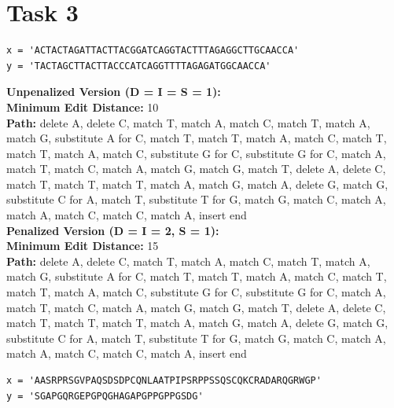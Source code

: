 \documentclass{article}
\begin{document}




\section*{Task 3}

\begin{lstlisting}
x = 'ACTACTAGATTACTTACGGATCAGGTACTTTAGAGGCTTGCAACCA'
y = 'TACTAGCTTACTTACCCATCAGGTTTTAGAGATGGCAACCA'
\end{lstlisting}

\textbf{Unpenalized Version (D = I = S = 1):} \\
\textbf{Minimum Edit Distance:}  10 \\
\textbf{Path:}  delete A, delete C, match T, match A, match C, match T, match A, match G, substitute A for C, match T, match T, match A, match C, match T, match T, match A, match C, substitute G for C, substitute G for C, match A, match T, match C, match A, match G, match G, match T, delete A, delete C, match T, match T, match T, match A, match G, match A, delete G, match G, substitute C for A, match T, substitute T for G, match G, match C, match A, match A, match C, match C, match A, insert end \\

\textbf{Penalized Version (D = I = 2, S = 1):} \\
\textbf{Minimum Edit Distance:}  15 \\
\textbf{Path:}  delete A, delete C, match T, match A, match C, match T, match A, match G, substitute A for C, match T, match T, match A, match C, match T, match T, match A, match C, substitute G for C, substitute G for C, match A, match T, match C, match A, match G, match G, match T, delete A, delete C, match T, match T, match T, match A, match G, match A, delete G, match G, substitute C for A, match T, substitute T for G, match G, match C, match A, match A, match C, match C, match A, insert end \\

\begin{lstlisting}
x = 'AASRPRSGVPAQSDSDPCQNLAATPIPSRPPSSQSCQKCRADARQGRWGP'
y = 'SGAPGQRGEPGPQGHAGAPGPPGPPGSDG'
\end{lstlisting}
\end{document}
